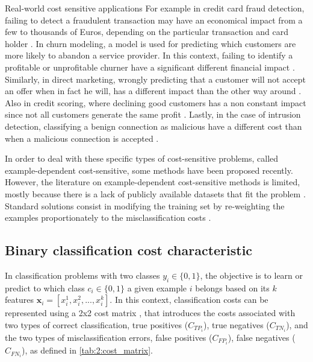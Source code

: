  \begin{remark}{Real-world cost sensitive applications}
  For example in credit card fraud detection, failing to detect a fraudulent transaction may have 
  an economical impact from a few to thousands of Euros, depending on the particular transaction 
  and card holder \citep{Sahin2013}. In churn modeling, a model is used for predicting which
  customers are more likely to abandon a service provider. In this context, failing to identify a 
  profitable or unprofitable churner have a significant different financial impact 
  \citep{Glady2009}. Similarly, in direct marketing, wrongly predicting that a customer will not 
  accept an offer when in fact he will, has a different impact than the other way around 
  \citep{Zadrozny2003}. Also in credit scoring, where declining good customers has a non constant 
  impact since not all  customers generate the same profit \citep{Verbraken2014}. Lastly, in the 
  case of intrusion   detection, classifying a benign connection as malicious have a different cost 
  than when a   malicious connection is accepted \citep{Ma2011}.
  \end{remark}

  In order to deal with these specific types of cost-sensitive problems, called example-dependent
  cost-sensitive, some methods have been proposed recently. However, the literature on 
  example-dependent cost-sensitive methods is limited, mostly because there is a lack of publicly 
  available datasets that fit the problem \citep{MacAodha2013}. Standard solutions consist in 
  modifying the training set by re-weighting the examples proportionately to the misclassification 
  costs \citep{Elkan2001,Zadrozny2003}.

  
\subsection{Binary classification cost characteristic}
  In classification problems with two classes $y_i \in \{0,1\}$, the objective is to learn or 
  predict to which class $c_i \in \{0,1\}$ a given example $i$ belongs based on its $k$ features 
  $\mathbf{x}_i=[x^1_i, x^2_i,...,x^k_i]$. In this context, classification costs can be 
  represented using a 2x2 cost matrix \citep{Elkan2001}, that introduces the costs 
  associated with   two types of correct   classification, true positives ($C_{TP_i}$), true 
  negatives ($C_{TN_i}$),   and the two  types of   misclassification errors, false positives 
  ($C_{FP_i}$), false negatives   ($C_{FN_i}$), as   defined in \tablename{ 
  \ref{tab:2:cost_matrix}}.
  \label{ntn:ch2:2}
  
